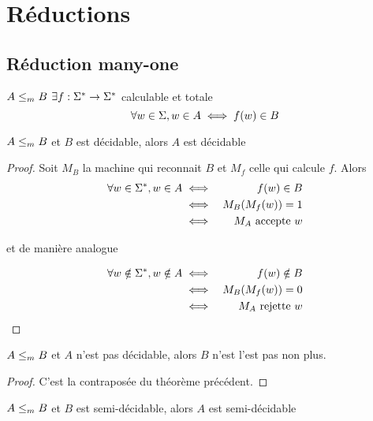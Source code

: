\section{Réductions}

\subsection{Réduction many-one}

\begin{definition}
	$A \leq_m B$ \ssi $\exists f : \Sigma^{*} \to \Sigma^{*}$ calculable et totale \tlq
	$$\forall w \in \Sigma, w \in A \iff f(w) \in B$$
\end{definition}


\begin{theorem} \label{thm:leqm_dec}
	$A \leq_m B$ et $B$ est décidable, alors $A$ est décidable
\end{theorem}

\begin{proof}

	Soit $M_B$ la machine qui reconnait $B$ et $M_f$ celle qui calcule $f$. Alors
	\begin{eqnarray*}
		\forall w \in \Sigma^{*}, w \in A &\iff& f(w) \in B \\
		&\iff& M_B (M_f (w)) = 1 \\
		&\iff& M_A \text{ accepte } w
	\end{eqnarray*}

	et de manière analogue

	\begin{eqnarray*}
		\forall w \notin \Sigma^{*}, w \notin A &\iff& f(w) \notin B \\
		&\iff& M_B (M_f (w)) = 0 \\
		&\iff& M_A \text{ rejette } w
	\end{eqnarray*}


\end{proof}


\begin{coro}
	$A \leq_m B$ et $A$ n'est pas décidable, alors $B$ n'est l'est pas non plus.
\end{coro}

\begin{proof}
	C'est la contraposée du théorème précédent.
\end{proof}

\begin{theorem}
	$A \leq_m B$ et $B$ est semi-décidable, alors $A$ est semi-décidable
\end{theorem}

